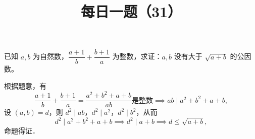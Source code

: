 \documentclass[a4paper]{exam}
\title{\huge \heiti \color{dblue} 每日一题（31）\\\pgfornament[scale=0.4]{84}}
\author{}
\date{}
\begin{document}
\maketitle

\thispagestyle{headandfoot}


\begin{questions}

\setcounter{question}{30}

\question
已知 $a,b$ 为自然数，$\dfrac{a+1}{b}+\dfrac{b+1}a$ 为整数，求证：$a,b$ 没有大于 $\sqrt{a+b}$ 的公因数。

\begin{solution}[\stretch{1}]
    根据题意，有\[\dfrac{a+1}{b}+\dfrac{b+1}a = \dfrac{a^2+b^2+a+b}{ab} \text{是整数} \implies ab\mid a^2+b^2+a+b,\]设 $(a,b)=d$，则 $d^2\mid ab$，$d^2\mid a^2$，$d^2\mid b^2$，从而\[d^2\mid a^2+b^2+a+b\implies d^2\mid a+b\implies d\leqslant \sqrt{a+b},\]命题得证．
\end{solution}

\end{questions}
\end{document}
